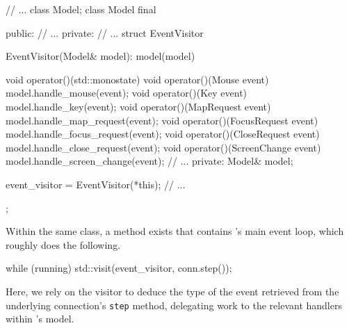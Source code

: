 \begin{cppblock}
  // ...
  class Model;
  class Model final
  {
  public:
    // ...
  private:
    // ...
    struct EventVisitor {
      EventVisitor(Model& model): model(model) {}

      void operator()(std::monostate) {}
      void operator()(Mouse event) {
        model.handle_mouse(event);
      }
      void operator()(Key event) {
        model.handle_key(event);
      }
      void operator()(MapRequest event) {
        model.handle_map_request(event);
      }
      void operator()(FocusRequest event) {
        model.handle_focus_request(event);
      }
      void operator()(CloseRequest event) {
        model.handle_close_request(event);
      }
      void operator()(ScreenChange event) {
        model.handle_screen_change(event);
      }
      // ...
    private:
      Model& model;
    } event_visitor = EventVisitor(*this);
    // ...
  };
\end{cppblock}

Within the same class, a method  exists that contains \mbox{\wmcpp}'s main event
loop, which roughly does the following.

\begin{cppblock}
  while (running)
    std::visit(event_visitor, conn.step());
\end{cppblock}

Here, we rely on the visitor to deduce  the type of the event retrieved from the
underlying connection's  \texttt{step} method,  delegating work  to the
relevant handlers within \wmcpp's model.
